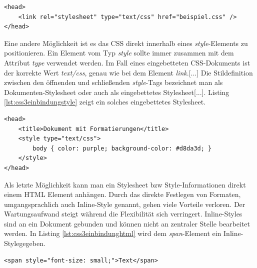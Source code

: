 \documentclass[12pt,a4paper,bibliography=totocnumbered,listof=totocnumbered]{scrartcl}
\begin{document}
	\vspace{1em}
	\begin{lstlisting}[caption=Stylesheet Einbindung über \textit{link}-Element, label=lst:css3einbindunglink]
<head>
    <link rel="stylesheet" type="text/css" href="beispiel.css" />
</head>
	\end{lstlisting}

Eine andere Möglichkeit ist es das CSS direkt innerhalb eines \textit{style}-Elements zu positionieren. Ein Element vom Typ \glqq \textit{style} sollte immer zusammen mit dem Attribut \textit{type} verwendet werden. Im Fall eines eingebetteten CSS-Dokuments ist der korrekte Wert \glqq \textit{text/css}\grqq, genau wie bei dem Element \textit{link}.[...] Die Stildefinition zwischen den öffnenden und schließenden \textit{style}-Tags bezeichnet man als Dokumenten-Stylesheet oder auch als eingebettetes Stylesheet[...].\grqq{}\cite[S.19]{MeyeCasc2005} Listing \ref{lst:css3einbindungstyle} zeigt ein solches eingebettetes Stylesheet.

	\vspace{1em}
	\begin{lstlisting}[caption=Stylesheet Einbindung über \textit{style}-Element, label=lst:css3einbindungstyle]
<head>
	<title>Dokument mit Formatierungen</title>
	<style type="text/css">
		body { color: purple; background-color: #d8da3d; }
	</style>
</head>
	\end{lstlisting}
	
Als letzte Möglichkeit kann man ein Stylesheet bzw Style-Informationen direkt einem HTML Element anhängen. \glqq Durch das direkte Festlegen von Formaten, umgangsprachlich auch \glqq Inline-Style\grqq{} genannt, gehen viele Vorteile verloren. Der Wartungsaufwand steigt während die Flexibilität sich verringert. Inline-Styles sind an ein Dokument gebunden und können nicht an zentraler Stelle bearbeitet werden.\grqq{}\cite{SelfHtml20144} In Listing \ref{lst:css3einbindunghtml} wird dem \textit{span}-Element ein \glqq Inline-Style\grqq gegeben.

	\vspace{1em}
	\begin{lstlisting}[caption=Stylesheet Einbindung in \textit{html}-Element, label=lst:css3einbindunghtml]
<span style="font-size: small;">Text</span>
	\end{lstlisting}
	
\end{document}
